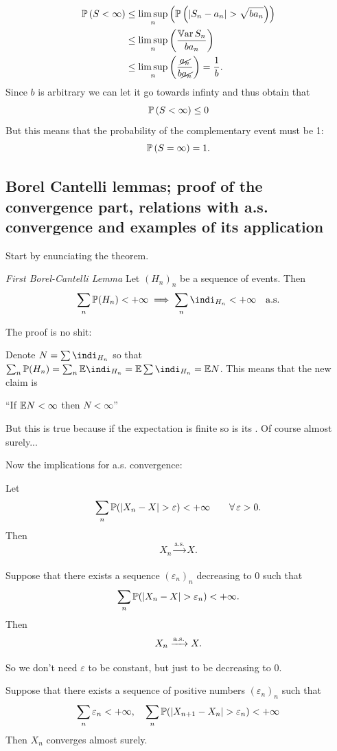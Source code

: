 \documentclass{report}
\begin{document}
\begin{fancyproof}
\begin{align*}
		\pr\left(S<\infty\right)&\leq\limsup_n\left(\pr\left(|S_{n}-a_{n}|>\sqrt{ba_{n}}\right)\right)\\
		&\leq\limsup_n\left(\frac{\var S_{n}}{ba_{n}}\right)\\
		&\leq\limsup_n\left(\frac{\cancel{a_{n}}}{b\cancel{a_{n}}}\right)=\frac{1}{b}.
	\end{align*}
	Since $b$ is arbitrary we can let it go towards infinty and thus obtain that
	\begin{equation*}
		\mathbb{P}\left(S<\infty\right)\leq0
	\end{equation*}
	But this means that the probability of the complementary event must be 1:
	\begin{equation*}
		\mathbb{P}\left(S=\infty\right)=1.
	\end{equation*}
\end{fancyproof}
\subsection{Borel Cantelli lemmas; proof of the convergence part, relations with a.s. convergence and
examples of its application}
Start by enunciating the theorem.
\begin{theorem}
	\emph{First Borel-Cantelli Lemma}
	Let ${(H_n)}_{n}$ be a sequence of events. Then
	\[\sum_n\pr(H_n)<+\infty\implies\sum_n\indi_{H_n}<+\infty\quad\text{a.s.}\]
\end{theorem}
The proof is no shit:
\begin{fancyproof}
	Denote $N=\sum\indi_{H_{n}}$ so that $\sum_{n}\pr(H_{n})=\sum_n\ev\indi_{H_{n}}=\ev\sum\indi_{H_{n}}=\ev N$. This means that the new claim is
	\begin{center}
		``If $\mathbb{E} N<\infty$ then $N<\infty$''
	\end{center}
	But this is true because if the expectation is finite so is its \rv{}. Of course almost surely...
\end{fancyproof}
Now the implications for a.s. convergence:
\begin{proposition}
	Let
	\[\sum_n\pr(|X_n-X|>\varepsilon)<+\infty\qquad\every\varepsilon>0.\]
	Then 
	\[X_n\xrightarrow[]{\text{a.s.}}X.\]
\end{proposition}
\begin{proposition}
	Suppose that there exists a sequence ${(\varepsilon_n)}_{n}$ decreasing to 0 such that
	\[\sum_n\pr(|X_n-X|>\varepsilon_n)<+\infty.\]
	Then
	\[X_n\xrightarrow[]{\text{a.s.}} X.\]
\end{proposition}
So we don't need $\varepsilon$ to be constant, but just to be decreasing to 0.
\begin{proposition}
	Suppose that there exists a sequence of positive numbers ${(\varepsilon_n)}_{n}$ such that
	\[\sum_n\varepsilon_n<+\infty,\quad\sum_n\pr(|X_{n+1}-X_n|>\varepsilon_n)<+\infty\]
	Then $X_n$ converges almost surely.
\end{proposition}
\end{document}
